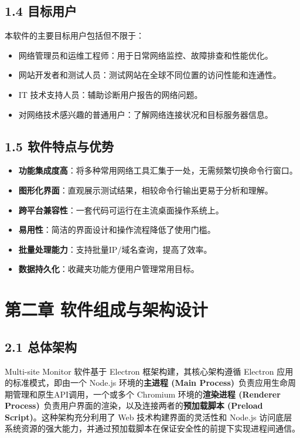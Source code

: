 \documentclass{article}
\begin{document}
\subsection*{1.4 目标用户}

本软件的主要目标用户包括但不限于：

\begin{itemize}
    \item 网络管理员和运维工程师：用于日常网络监控、故障排查和性能优化。
    \item 网站开发者和测试人员：测试网站在全球不同位置的访问性能和连通性。
    \item IT 技术支持人员：辅助诊断用户报告的网络问题。
    \item 对网络技术感兴趣的普通用户：了解网络连接状况和目标服务器信息。
\end{itemize}

\subsection*{1.5 软件特点与优势}

\begin{itemize}
    \item \textbf{功能集成度高}：将多种常用网络工具汇集于一处，无需频繁切换命令行窗口。
    \item \textbf{图形化界面}：直观展示测试结果，相较命令行输出更易于分析和理解。
    \item \textbf{跨平台兼容性}：一套代码可运行在主流桌面操作系统上。
    \item \textbf{易用性}：简洁的界面设计和操作流程降低了使用门槛。
    \item \textbf{批量处理能力}：支持批量IP/域名查询，提高了效率。
    \item \textbf{数据持久化}：收藏夹功能方便用户管理常用目标。
\end{itemize}

\hrulefill

\section*{第二章 软件组成与架构设计}

\subsection*{2.1 总体架构}

Multi-site Monitor 软件基于 Electron 框架构建，其核心架构遵循 Electron 应用的标准模式，即由一个 Node.js 环境的\textbf{主进程 (Main Process)}\ 负责应用生命周期管理和原生API调用，一个或多个 Chromium 环境的\textbf{渲染进程 (Renderer Process)}\ 负责用户界面的渲染，以及连接两者的\textbf{预加载脚本 (Preload Script)}。这种架构充分利用了 Web 技术构建界面的灵活性和 Node.js 访问底层系统资源的强大能力，并通过预加载脚本在保证安全性的前提下实现进程间通信。
\end{document}
